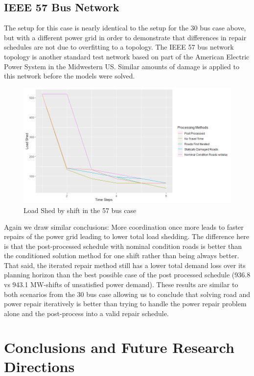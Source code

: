 \documentclass[10pt]{article}
\begin{document}
\subsection{IEEE 57 Bus Network}
 \vspace*{-12pt}
The setup for this case is nearly identical to the setup for the 30 bus case above, but with a different power grid in order to demonstrate that differences in repair schedules are not due to overfitting to a topology. The IEEE 57 bus network topology is another standard test network based on part of the American Electric Power System in the Midwestern US. Similar amounts of damage is applied to this network before the models were solved.

\begin{figure}[]
	\centering
	\caption{Load Shed by shift in the 57 bus case}
	\includegraphics[width=.5\textwidth, height=0.5\textheight,keepaspectratio]{RPlot57Fixed.png}
	
\end{figure}

Again we draw similar conclusions: More coordination once more leads to faster repairs of the power grid leading to lower total load shedding. The difference here is that the post-processed schedule with nominal condition roads is better than the conditioned solution method for one shift rather than being always better. That said, the iterated repair method still has a lower total demand loss over its planning horizon than the best possible case of the post processed schedule (936.8 vs 943.1 MW-shifts of unsatisfied power demand). These results are similar to both scenarios from the 30 bus case allowing us to conclude that solving road and power repair iteratively is better than trying to handle the power repair problem alone and the post-process into a valid repair schedule.
\section{\large{Conclusions and Future Research Directions}}
\label{sec:issues}
\vspace*{-12pt}
\end{document}
